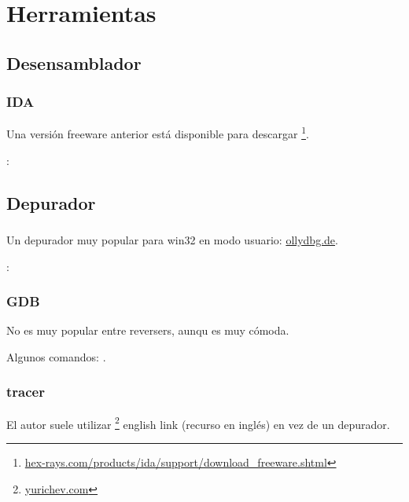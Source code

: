 \chapter{Herramientas}

\section{Desensamblador}

\subsection{IDA}

\label{IDA}
Una versi\'on freeware anterior est\'a disponible para descargar
\footnote{\href{http://go.yurichev.com/17031}{hex-rays.com/products/ida/support/download\_freeware.shtml}}.

\ShortHotKeyCheatsheet: 

\section{Depurador}

\subsection{\olly}
\myindex{\olly}

Un depurador muy popular para win32 en modo usuario: \href{http://go.yurichev.com/17032}{ollydbg.de}.

\ShortHotKeyCheatsheet: 

\subsection{GDB}

No es muy popular entre reversers, aunqu es muy c\'omoda. %

Algunos comandos: .

\subsection{tracer}

\label{tracer}
El autor suele utilizar 
\footnote{\href{http://go.yurichev.com/17338}{yurichev.com}} english link
(recurso en ingl\'es) en vez de un depurador.%

